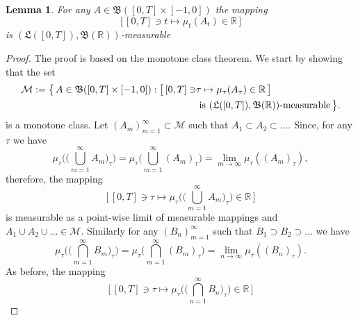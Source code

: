 \documentclass[reqno]{amsart}
\theoremstyle{plain}
\newtheorem{lemma}{Lemma}[section]
\numberwithin{equation}{section}
\numberwithin{definition}{section}
\newcommand\RR{\ensuremath{\mathbb{R}}}
\begin{document}
\smallskip\par
\begin{lemma}\label{lemma:borel-monotone-class-measurable} For any $A\in    \mathfrak{B}([0,T]\times [-1,0])$ the mapping 
\begin{equation}
     \big[\,[0,T]\ni t\mapsto \mu_t(A_{t})\in\RR\,\big] 
\end{equation}
is $(\mathfrak{L}([0, T]), \mathfrak{B}(\RR))$\nobreakdash-\hspace{0pt}measurable
\end{lemma}
\begin{proof}
 The proof is based on the monotone class theorem. We start by showing that the set 
 \begin{equation*}
 \begin{split}
          \mathcal{M} : = \big\{\,  A\in \mathfrak{B}([0,T]\times  [-1,0]) :  \big[\,[0,T]\ni & \tau\mapsto \mu_{\tau}(A_{\tau})\in\RR\,\big]   \\ & \text{ is } (\mathfrak{L}([0, T]), \mathfrak{B}(\RR))\text{\nobreakdash-\hspace{0pt}measurable} \, \big\}.  
 \end{split}
 \end{equation*}
 is a monotone class. Let $(A_m)_{m=1}^{\infty}\subset  \mathcal{M}$ such that $A_1\subset A_2\subset \dots $. Since, for any $\tau$ we have  
   \begin{equation*}
            \mu_{\tau}\Big(\Big(\bigcup_{m=1}^{\infty} A_{m}\Big)_{\tau}\Big)  =  \mu_{\tau}\Big(\bigcup_{m=1}^{\infty} (A_{m})_{\tau}\Big)  
       =\lim_{m\to\infty} \mu_{\tau}( (A_{m})_{\tau}), 
   \end{equation*}
  therefore, the mapping 
   \begin{equation*}
         \Big[\,[0,T]\ni \tau \mapsto \mu_{\tau}\Big(\Big(\bigcup_{m=1}^{\infty} A_{m}\Big)_{\tau}\Big) \in\RR \,\Big]
   \end{equation*}
   is measurable as a point-wise limit of measurable mappings and $A_1\cup A_2\cup\dots \in \mathcal{M}$. Similarly for any $(B_n)_{m=1}^{\infty}$  such that $B_1\supset B_2\supset \dots$ we have 
      \begin{equation*}
        \mu_{\tau}\Big(\Big(\bigcap_{m=1}^{\infty} B_{m}\Big)_{\tau}\Big)  =  \mu_{\tau}\Big(\bigcap_{m=1}^{\infty} (B_{m})_{\tau}\Big) 
       =\lim_{n\to\infty} \mu_{\tau}( (B_{n})_{\tau}). 
      \end{equation*}
   As before, the mapping 
    \begin{equation*}
         \Big[\,[0,T] \ni \tau \mapsto \mu_{\tau}\Big(\Big(\bigcap_{n=1}^{\infty} B_{n}\Big)_{\tau}\Big) \in\RR \,\Big]

\end{equation*}
\end{proof}
\end{document}

